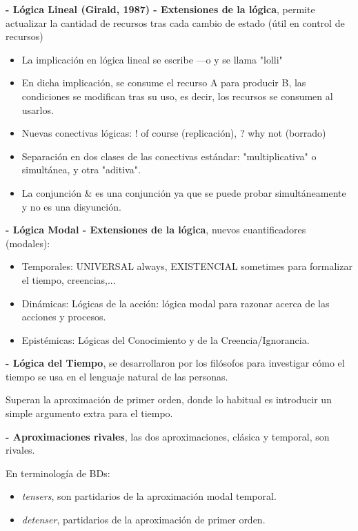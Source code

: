 \documentclass[12pt]{amsart}
\begin{document}
    \textbf{- Lógica Lineal (Girald, 1987) - Extensiones de la lógica},
    permite actualizar la cantidad de recursos tras cada cambio de estado 
    (útil en control de recursos)

    \begin{itemize}
        \item La implicación en lógica lineal se escribe ---o y se llama "lolli"
        \item En dicha implicación, se consume el recurso A para producir
        B, las condiciones se modifican tras su uso, es decir, los recursos
        se consumen al usarlos.
        \item Nuevas conectivas lógicas: ! of course (replicación), ? why not (borrado)
        \item Separación en dos clases de las conectivas estándar: "multiplicativa"
        o simultánea, y otra "aditiva".
        \item La conjunción \& es una conjunción ya que se puede probar
        simultáneamente y no es una disyunción. 
    \end{itemize}

    \textbf{- Lógica Modal - Extensiones de la lógica}, nuevos cuantificadores
    (modales):
    \begin{itemize}
        \item  Temporales: UNIVERSAL always, EXISTENCIAL sometimes para formalizar el tiempo,
        creencias,...
        \item Dinámicas: Lógicas de la acción: lógica modal para razonar
        acerca de las acciones y procesos.
        \item Epistémicas: Lógicas del Conocimiento y de la Creencia/Ignorancia.
    \end{itemize}

    \textbf{- Lógica del Tiempo}, se desarrollaron por los filósofos
    para investigar cómo el tiempo se usa en el lenguaje natural
    de las personas.

    Superan la aproximación de primer orden, donde lo habitual es introducir un simple argumento extra para el tiempo.

    \textbf{- Aproximaciones rivales}, las dos aproximaciones, clásica y
    temporal, son rivales.

    En terminología de BDs:
    
    \begin{itemize}
        \item  \emph{tensers}, son partidarios de la
        aproximación modal temporal.

        \item \emph{detenser}, partidarios de la aproximación de primer
        orden.

    \end{itemize}
    
\end{document}
